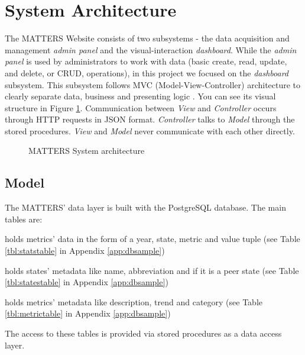 	\section{System Architecture}
	
		The MATTERS Website consists of two subsystems - the data acquisition 
		and management \emph{admin panel} and the visual-interaction 
		\emph{dashboard}. While the \emph{admin panel} is used by administrators
		to work with data (basic create, read, update, and delete, or CRUD, 
		operations), in this project we focused on the \emph{dashboard} 
		subsystem. This subsystem follows MVC (Model-View-Controller) 
		architecture to clearly separate data, business and presenting logic \cite{mvc}.
		You can see its visual structure in Figure \ref{fig:sysarch}. 
		Communication between \emph{View} and \emph{Controller} occurs through 
		HTTP requests in JSON format. \emph{Controller} talks to \emph{Model} 
		through the stored procedures. \emph{View} and \emph{Model} never 
		communicate with each other directly.
		
		\begin{figure}[t]
			\centering
			
			\caption{MATTERS System architecture}
			\label{fig:sysarch}
		\end{figure}
		
		
		\subsection{Model}
			
			The MATTERS' data layer is built with the PostgreSQL database. The 
			main tables are:
			
			\begin{description}[itemsep=-1.5mm, align=right,labelwidth=3cm]
				\item [Statistics]
					holds metrics' data in the form of a year, state, metric and 
					value tuple (see Table \ref{tbl:statstable} in Appendix \ref{app:dbsample})
				\item [States]
					holds states' metadata like name, abbreviation and if it is 
					a peer state (see Table \ref{tbl:statestable} in Appendix \ref{app:dbsample})
				\item [Metrics]
					holds metrics' metadata like description, trend and 
					category (see Table \ref{tbl:metrictable} in Appendix \ref{app:dbsample})
			\end{description}
			
			The access to these tables is provided via stored procedures as a 
			data access layer.
			
